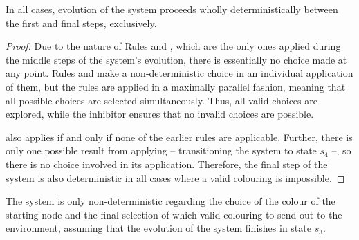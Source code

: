 \begin{lemma}\label{lemma:gcol:determin}
In all cases, evolution of the system proceeds wholly deterministically between the first and final steps, exclusively.
\end{lemma}

\begin{proof}
Due to the nature of Rules  and , which are the only ones applied during the middle steps of the system's evolution, there is essentially no choice made at any point.  Rules  and  make a non-deterministic choice in an individual application of them, but the rules are applied in a maximally parallel fashion, meaning that all possible choices are selected simultaneously.  Thus, all valid choices are explored, while the \gls{inhibitor} ensures that no invalid choices are possible.

 also applies if and only if none of the earlier rules are applicable.  Further, there is only one possible result from applying  -- transitioning the system to state \(s_4\) --, so there is no choice involved in its application.  Therefore, the final step of the system is also deterministic in all cases where a valid colouring is impossible.

\end{proof}

\begin{lemma}\label{lemma:gcol:nondet}

The system is only non-deterministic regarding the choice of the colour of the starting node and the final selection of which valid colouring to send out to the environment, assuming that the evolution of the system finishes in state \(s_3\).
\end{lemma}

